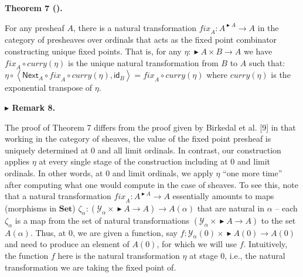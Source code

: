 \documentclass[10pt,a4paper]{article}
\begin{document}
 
 
\par\medskip\noindent\textbf{Theorem 7 ().}\par
 
 
For any presheaf $A$, there is a natural transformation $\mathit{fix}_{A}:A^{\mathop{\blacktriangleright}{}A}\to A$ in the category of presheaves over ordinals that acts as the fixed point combinator constructing unique fixed points. That is, for any $\eta:\mathop{\blacktriangleright}{}A\times B\to A$ we have $\mathit{fix}_{A}\circ\mathit{curry}\left(\eta\right)$ is the unique natural transformation from $B$ to $A$ such that: $\eta\circ\left<\mathsf{Next}_{A}\circ\mathit{fix}_{A}\circ\mathit{curry}\left(\eta\right),\mathsf{id}_{B}\right>=\mathit{fix}_{A}\circ\mathit{curry}\left(\eta\right)$ where $\mathit{curry}\left(\eta\right)$ is the exponential transpose of $\eta$.\par
 
 
 
 
\par\medskip\noindent\textbf{$\blacktriangleright$ Remark 8.}\par
 
 
The proof of Theorem 7 differs from the proof given by Birkedal et al. [9] in that working in the category of sheaves, the value of the fixed point presheaf is uniquely determined at 0 and all limit ordinals. In contrast, our construction applies $\eta$ at every single stage of the construction including at 0 and limit ordinals. In other words, at 0 and limit ordinals, we apply $\eta$ “one more time” after computing what one would compute in the case of sheaves. To see this, note that a natural transformation $\mathit{fix}_{A}:A^{\mathop{\blacktriangleright}{}A}\to A$ essentially amounts to maps (morphisms in $\mathbf{Set}{}$) $\zeta_{\alpha}:(\mathcal{Y}_{\alpha}\times\mathop{\blacktriangleright}{}A\to A)\to A(\alpha)$ that are natural in $\alpha$ – each $\zeta_{\alpha}$ is a map from the set of natural transformations $(\mathcal{Y}_{\alpha}\times\mathop{\blacktriangleright}{}A\to A)$ to the set $A(\alpha)$. Thus, at 0, we are given a function, say $f:\mathcal{Y}_{\alpha}(0)\times\mathop{\blacktriangleright}{}A(0)\to A(0)$ and need to produce an element of $A(0)$, for which we will use $f$. Intuitively, the function $f$ here is the natural transformation $\eta$ at stage 0, i.e., the natural transformation we are taking the fixed point of.\par
 
\end{document}
